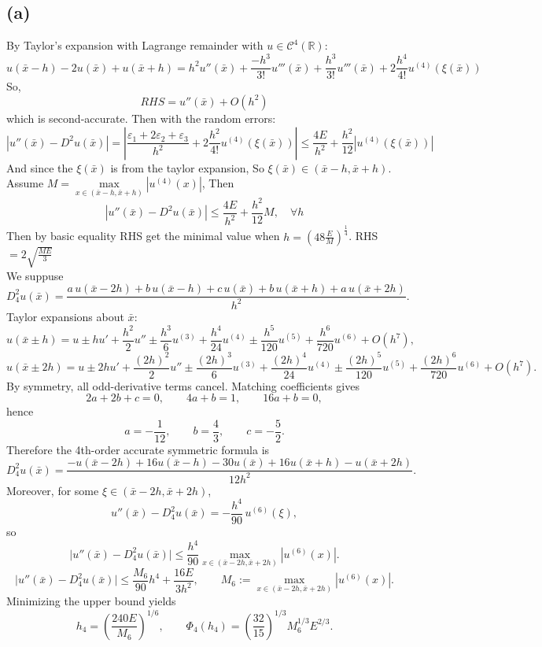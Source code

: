 \documentclass[a4paper]{article}
\begin{document}
\subsection*{(a)}
By Taylor's expansion with Lagrange remainder with \(u \in \mathcal{C}^4(\mathbb{R})\):
\[
u(\bar x-h) - 2u(\bar x) + u(\bar x+h)
= h^2u''(\bar x) + \frac{-h^3}{3!}u'''(\bar x) + \frac{h^3}{3!}u'''(\bar x) + 2\frac{h^4}{4!}u^{(4)}(\xi(\bar x))
\]
So,
\[
RHS = u''(\bar x) + O(h^2)
\]
which is second-accurate. Then with the random errors:
\[
|u''(\bar x) - D^2u(\bar x)| = |\frac{\varepsilon_1+2\varepsilon_2+\varepsilon_3}{h^2} + 2\frac{h^2}{4!}u^{(4)}(\xi(\bar x))|
\leqslant \frac{4E}{h^2} + \frac{h^2}{12}|u^{(4)}(\xi(\bar x))|
\]
And since the \(\xi(\bar x)\) is from the taylor expansion, So \(\xi(\bar x) \in (\bar x-h,\bar x+h)\).\\
Assume \(M = \max\limits_{x \in (\bar x-h,\bar x+h)}|u^{(4)}(x)|\), Then
\[
|u''(\bar x) - D^2u(\bar x)| \leqslant \frac{4E}{h^2} + \frac{h^2}{12}M , \quad \forall h
\]
Then by basic equality RHS get the minimal value when \(h = (48\frac{E}{M})^{\frac{1}{4}}\). RHS \(= 2 \sqrt{\frac{ME}{3}} \) \\
We suppuse
\[
D_4^2 u(\bar x)
=\frac{a\,u(\bar x-2h)+b\,u(\bar x-h)+c\,u(\bar x)+b\,u(\bar x+h)+a\,u(\bar x+2h)}{h^2}.
\]
Taylor expansions about $\bar x$:
\[
u(\bar x\pm h)=u \pm h u' +\frac{h^2}{2}u'' \pm \frac{h^3}{6}u^{(3)}
+\frac{h^4}{24}u^{(4)}\pm \frac{h^5}{120}u^{(5)}+\frac{h^6}{720}u^{(6)}+O(h^7),
\]
\[
u(\bar x\pm 2h)=u \pm 2h u' +\frac{(2h)^2}{2}u'' \pm \frac{(2h)^3}{6}u^{(3)}
+\frac{(2h)^4}{24}u^{(4)}\pm \frac{(2h)^5}{120}u^{(5)}+\frac{(2h)^6}{720}u^{(6)}+O(h^7).
\]
By symmetry, all odd-derivative terms cancel. Matching coefficients gives
\[
2a+2b+c=0,\qquad 4a+b=1,\qquad 16a+b=0,
\]
hence
\[
a=-\frac{1}{12},\qquad b=\frac{4}{3},\qquad c=-\frac{5}{2}.
\]
Therefore the 4th-order accurate symmetric formula is
\[
D_4^2 u(\bar x)
=\frac{-u(\bar x-2h)+16u(\bar x-h)-30u(\bar x)+16u(\bar x+h)-u(\bar x+2h)}{12h^2}.
\]
Moreover, for some $\xi\in(\bar x-2h,\bar x+2h)$,
\[
u''(\bar x)-D_4^2u(\bar x)= -\frac{h^4}{90}\,u^{(6)}(\xi),
\]
so
\[
\bigl|u''(\bar x)-D_4^2u(\bar x)\bigr|
\le \frac{h^4}{90}\max_{x\in(\bar x-2h,\bar x+2h)}|u^{(6)}(x)|.
\]
\[
\bigl|u''(\bar x)-D_4^2u(\bar x)\bigr|
\le \frac{M_6}{90}h^4+\frac{16E}{3h^2},
\qquad
M_6:=\max_{x\in(\bar x-2h,\bar x+2h)}|u^{(6)}(x)|.
\]
Minimizing the upper bound yields
\[
h_{4}=\left(\frac{240E}{M_6}\right)^{1/6},
\qquad
\Phi_4(h_{4})
=\left(\frac{32}{15}\right)^{1/3}M_6^{1/3}E^{2/3}.
\]
\end{document}
